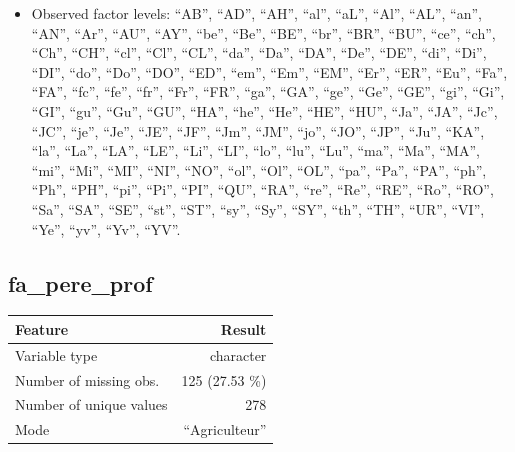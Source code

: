 \documentclass[
  letterpaper,
  DIV=11,
  numbers=noendperiod]{scrartcl}
\providecommand{\tightlist}{%
  \setlength{\itemsep}{0pt}\setlength{\parskip}{0pt}}
\begin{document}
\emini

\begin{itemize}
\tightlist
\item
  Observed factor levels: ``AB'', ``AD'', ``AH'', ``al'', ``aL'',
  ``Al'', ``AL'', ``an'', ``AN'', ``Ar'', ``AU'', ``AY'', ``be'',
  ``Be'', ``BE'', ``br'', ``BR'', ``BU'', ``ce'', ``ch'', ``Ch'',
  ``CH'', ``cl'', ``Cl'', ``CL'', ``da'', ``Da'', ``DA'', ``De'',
  ``DE'', ``di'', ``Di'', ``DI'', ``do'', ``Do'', ``DO'', ``ED'',
  ``em'', ``Em'', ``EM'', ``Er'', ``ER'', ``Eu'', ``Fa'', ``FA'',
  ``fc'', ``fe'', ``fr'', ``Fr'', ``FR'', ``ga'', ``GA'', ``ge'',
  ``Ge'', ``GE'', ``gi'', ``Gi'', ``GI'', ``gu'', ``Gu'', ``GU'',
  ``HA'', ``he'', ``He'', ``HE'', ``HU'', ``Ja'', ``JA'', ``Jc'',
  ``JC'', ``je'', ``Je'', ``JE'', ``JF'', ``Jm'', ``JM'', ``jo'',
  ``JO'', ``JP'', ``Ju'', ``KA'', ``la'', ``La'', ``LA'', ``LE'',
  ``Li'', ``LI'', ``lo'', ``lu'', ``Lu'', ``ma'', ``Ma'', ``MA'',
  ``mi'', ``Mi'', ``MI'', ``NI'', ``NO'', ``ol'', ``Ol'', ``OL'',
  ``pa'', ``Pa'', ``PA'', ``ph'', ``Ph'', ``PH'', ``pi'', ``Pi'',
  ``PI'', ``QU'', ``RA'', ``re'', ``Re'', ``RE'', ``Ro'', ``RO'',
  ``Sa'', ``SA'', ``SE'', ``st'', ``ST'', ``sy'', ``Sy'', ``SY'',
  ``th'', ``TH'', ``UR'', ``VI'', ``Ye'', ``yv'', ``Yv'', ``YV''.
\end{itemize}

\fullline

\subsection{fa\_pere\_prof}\label{fa_pere_prof}

\bminione

\begin{longtable}[]{@{}lr@{}}
\toprule\noalign{}
Feature & Result \\
\midrule\noalign{}
\endhead
\bottomrule\noalign{}
\endlastfoot
Variable type & character \\
Number of missing obs. & 125 (27.53 \%) \\
Number of unique values & 278 \\
Mode & ``Agriculteur'' \\
\end{longtable}

\emini
\bminitwo
\end{document}
